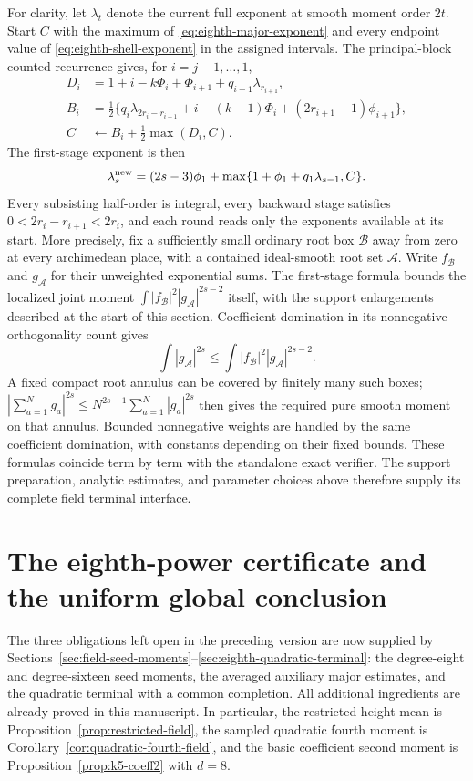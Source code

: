 \documentclass[11pt,reqno]{amsart}
\numberwithin{equation}{section}
\theoremstyle{definition}
\begin{document}
For clarity, let $\lambda_t$ denote the current full exponent at smooth
moment order $2t$. Start $C$ with the maximum of
\eqref{eq:eighth-major-exponent} and every endpoint value of
\eqref{eq:eighth-shell-exponent} in the assigned intervals.
The principal-block counted recurrence gives, for $i=j-1,\ldots,1$,
\[
 \begin{split}
 D_i&=1+i-k\Phi_i+\Phi_{i+1}+q_{i+1}\lambda_{r_{i+1}},\\
 B_i&=\tfrac12\{q_i\lambda_{2r_i-r_{i+1}}
                   +i-(k-1)\Phi_i+(2r_{i+1}-1)\phi_{i+1}\},\\
 C&\longleftarrow B_i+\tfrac12\max(D_i,C).
 \end{split}
\]
The first-stage exponent is then
\[
 \lambda_s^{\rm new}=(2s-3)\phi_1+
           \max\{1+\phi_1+q_1\lambda_{s-1},C\}.
\]
Every subsisting half-order is integral, every backward stage satisfies
$0<2r_i-r_{i+1}<2r_i$, and each round reads only the exponents available
at its start. More precisely, fix a sufficiently small ordinary root box
$\mathcal B$ away from zero at every archimedean place, with a contained
ideal-smooth root set $\mathcal A$. Write $f_{\mathcal B}$ and
$g_{\mathcal A}$ for their unweighted exponential sums. The first-stage
formula bounds the localized joint moment
$\int|f_{\mathcal B}|^2|g_{\mathcal A}|^{2s-2}$ itself, with the support
enlargements described at the start of this section. Coefficient domination
in its nonnegative orthogonality count gives
\[
 \int|g_{\mathcal A}|^{2s}
 \le \int|f_{\mathcal B}|^2|g_{\mathcal A}|^{2s-2}.
\]
A fixed compact root annulus can be covered by finitely many such boxes;
$|\sum_{a=1}^N g_a|^{2s}\le N^{2s-1}\sum_{a=1}^N|g_a|^{2s}$ then gives
the required pure smooth moment on that annulus. Bounded nonnegative
weights are handled by the same coefficient domination, with constants
depending on their fixed bounds. These formulas coincide term by term with
the standalone exact verifier.
The support preparation, analytic estimates, and parameter choices above
therefore supply its complete field terminal interface.


\section{The eighth-power certificate and the uniform global conclusion}
\label{sec:eighth-global}

The three obligations left open in the preceding version are now supplied
by Sections~\ref{sec:field-seed-moments}--\ref{sec:eighth-quadratic-terminal}:
the degree-eight and degree-sixteen seed moments, the averaged auxiliary
major estimates, and the quadratic terminal with a common completion.
All additional ingredients are already proved in this manuscript. In
particular, the restricted-height mean is Proposition~\ref{prop:restricted-field},
the sampled quadratic fourth moment is
Corollary~\ref{cor:quadratic-fourth-field}, and the basic coefficient
second moment is Proposition~\ref{prop:k5-coeff2} with $d=8$.
\end{document}
